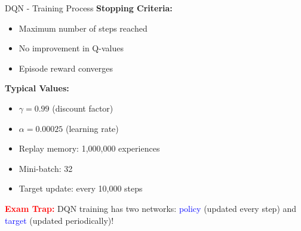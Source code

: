 \documentclass[8pt]{beamer}
\begin{document}
\begin{frame}{DQN - Training Process}
		\textbf{Stopping Criteria:}
		\begin{itemize}
			\item Maximum number of steps reached
			\item No improvement in Q-values
			\item Episode reward converges
		\end{itemize}
		
		\textbf{Typical Values:}
		\begin{itemize}
			\item $\gamma = 0.99$ (discount factor)
			\item $\alpha = 0.00025$ (learning rate)
			\item Replay memory: 1,000,000 experiences
			\item Mini-batch: 32
			\item Target update: every 10,000 steps
		\end{itemize}
		
		\textcolor{red}{\textbf{Exam Trap:}} DQN training has two networks: \textcolor{blue}{policy} (updated every step) and \textcolor{blue}{target} (updated periodically)!
	\end{frame}
	
\end{document}
